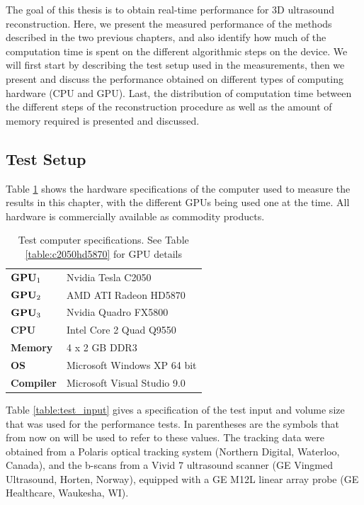 
The goal of this thesis is to obtain real-time performance for 3D ultrasound reconstruction. Here, we present the measured performance of the methods described in the two previous chapters, and also identify how much of the computation time is spent on the different algorithmic steps on the device. We will first start by describing the test setup used in the measurements, then we present and discuss the performance obtained on different types of computing hardware (CPU and GPU). Last, the distribution of computation time between the different steps of the reconstruction procedure as well as the amount of memory required is presented and discussed.

\subsection{Test Setup}

	Table \ref{table:test_computer} shows the hardware specifications of the computer used to measure the results in this chapter, with the different GPUs being used one at the time. All hardware is commercially available as commodity products.
	
	\begin{table}[h]
	\centering
	\begin{tabular}{| l l |}
		\hline
		$\textbf{GPU}_1$ & Nvidia Tesla C2050 \\
		$\textbf{GPU}_2$ & AMD ATI Radeon HD5870 \\
		$\textbf{GPU}_3$ & Nvidia Quadro FX5800 \\
		\textbf{CPU} & Intel Core 2 Quad Q9550 \\
		\textbf{Memory} & 4 x 2 GB DDR3 \\
		\textbf{OS} & Microsoft Windows XP 64 bit \\
		\textbf{Compiler} & Microsoft Visual Studio 9.0 \\
		\hline
	\end{tabular}
	\caption[Test computer specifications]{Test computer specifications. See Table \ref{table:c2050hd5870} for GPU details}
	\label{table:test_computer}
	\end{table}
	
	Table \ref{table:test_input} gives a specification of the test input and volume size that was used for the performance tests. In parentheses are the symbols that from now on will be used to refer to these values. The tracking data were obtained from a Polaris optical tracking system (Northern Digital, Waterloo, Canada), and the b-scans from a Vivid 7 ultrasound scanner (GE Vingmed Ultrasound, Horten, Norway), equipped with a GE M12L linear array probe (GE Healthcare, Waukesha, WI).
	
